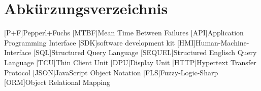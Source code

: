
\chapter*{Abkürzungsverzeichnis}
\begin{acronym}[slmtA]
    [P+F]{Pepperl+Fuchs}
    [MTBF]{Mean Time Between Failures}
    [API]{Application Programming Interface}
    [SDK]{software development kit}
    [HMI]{Human-Machine-Interface }
    [SQL]{Structured Query Language}
    [SEQUEL]{Structured Englisch Query Language}
    [TCU]{Thin Client Unit}
    [DPU]{Display Unit}
    [HTTP]{Hypertext Transfer Protocol}
    [JSON]{JavaScript Object Notation}
    [FLS]{Fuzzy-Logic-Sharp}
    [ORM]{Object Relational Mapping}
\end{acronym}
